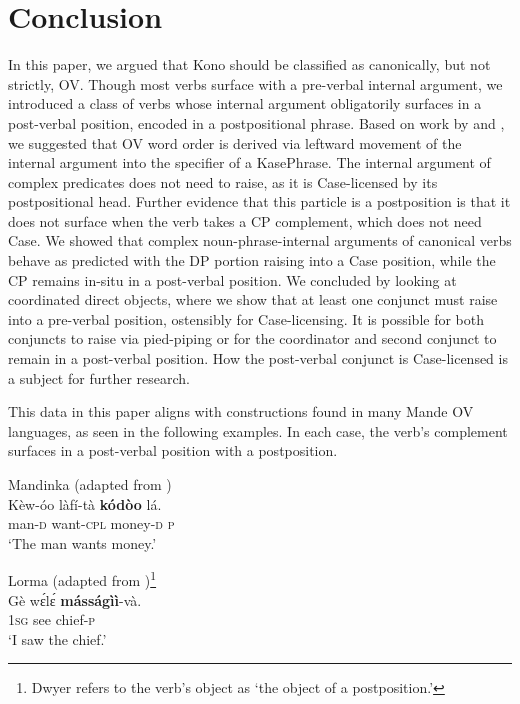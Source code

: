 \documentclass[output=paper,colorlinks,citecolor=brown,draftmode
]{langscibook}
\begin{document}
\section{Conclusion}
\label{sec:Conclusion}
In this paper, we argued that Kono should be classified as canonically, but not strictly, OV. Though most verbs surface with a pre-verbal internal argument, we introduced a class of verbs whose internal argument obligatorily surfaces in a post-verbal position, encoded in a postpositional phrase. Based on work by \citet{koopman1992absence} and \citet{SmithCLS, SmithDiss}, we suggested that OV word order is derived via leftward movement of the internal argument into the specifier of a KasePhrase. The internal argument of complex predicates does not need to raise, as it is Case-licensed by its postpositional head. Further evidence that this particle is a postposition is that it does not surface when the verb takes a CP complement, which does not need Case. We showed that complex noun-phrase-internal arguments of canonical verbs behave as predicted with the DP portion raising into a Case position, while the CP remains in-situ in a post-verbal position. We concluded by looking at coordinated direct objects, where we show that at least one conjunct must raise into a pre-verbal position, ostensibly for Case-licensing. It is possible for both conjuncts to raise via pied-piping or for the coordinator and second conjunct to remain in a post-verbal position. How the post-verbal conjunct is Case-licensed is a subject for further research. 

This data in this paper aligns with constructions found in many Mande OV languages, as seen in the following examples. In each case, the verb’s complement surfaces in a post-verbal position with a postposition. 

\begin{samepage}
\ea \label{ex:Mandinka}
Mandinka (adapted from \citealt[\#3]{creissels2024sketch}) \\
\gll Kèw-óo làfí-tà \textbf{kódòo} lá.  \\
man-\textsc{d} want-\textsc{cpl} money-\textsc{d} \textsc{p} \\
\glt `The man wants money.'
\z
\end{samepage}

\ea \label{ex:Lorma}
Lorma (adapted from \citealt[81-82]{dwyer1981reference})\footnote{Dwyer refers to the verb’s object as ‘the object of a postposition.’} \\
\gll Gè wɛ́lɛ́ \textbf{másságìì}-và. 	  \\
\textsc{1sg} see chief-\textsc{p} \\
\glt `I saw the chief.'
\z
\end{document}
